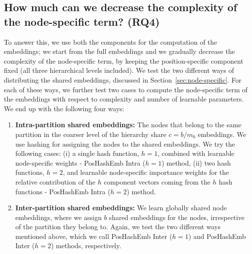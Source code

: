 \documentclass[conference]{IEEEtran}
\begin{document}
\subsection{How much can we decrease the complexity of the node-specific term? (RQ4)}
To answer this, we use both the components for the computation of the embeddings; we start from the full embeddings and we gradually decrease the complexity of the node-specific term, by keeping the position-specific component fixed (all three hierarchical levels included). 
We test the two different ways of distributing the shared embeddings, discussed in Section~\ref{sec:node-specific}. For each of these ways, we further test two cases to compute the node-specific term of the embeddings with respect to complexity and number of learnable parameters. We end up with the following four ways: 
\begin{enumerate}
    \item \textbf{Intra-partition shared embeddings:} The nodes that belong to the same partition in the coarser level of the hierarchy share $c=b/m_0$ embeddings. We use hashing for assigning the nodes to the shared embeddings. We try the following cases: (i) a single hash function, $h = 1$, combined with learnable node-specific weights - PosHashEmb Intra ($h=1$) method, (ii) two hash functions, $h = 2$, and learnable node-specific importance weights for the relative contribution of the $h$ component vectors coming from the $h$ hash functions - PosHashEmb Intra ($h=2$) method.  
    \item \textbf{Inter-partition shared embeddings:} We learn globally shared node embeddings, where we assign $b$ shared embeddings for the nodes, irrespective of the partition they belong to. Again, we test the two different ways mentioned above, which we call PosHashEmb Inter ($h=1$) and PosHashEmb Inter ($h=2$) methods, respectively. 
\end{enumerate}
\end{document}
